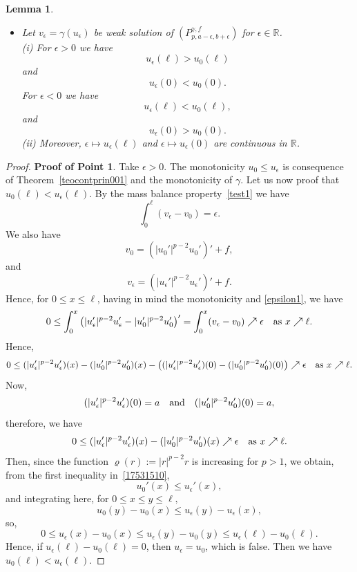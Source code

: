 \documentclass[10pt,a4paper]{amsart}
\newtheorem{lemma}{Lemma}
\begin{document}
\begin{lemma}
\begin{itemize}
\item[3.] Let   $v_\epsilon=\gamma(u_\epsilon)$ be weak solution of $(P_{p,a-\epsilon,b+\epsilon}^{\gamma,f})$ for $\epsilon\in \mathbb{R}$.
\\
(i) For $\epsilon>0$ we have
$$u_\epsilon(\ell)> u_0(\ell)$$ and
$$u_\epsilon(0)< u_0(0).$$
 For $\epsilon<0$ we have
$$u_\epsilon(\ell)< u_0(\ell),$$ and
$$u_\epsilon(0)> u_0(0).$$
(ii) Moreover, $\epsilon\mapsto u_\epsilon(\ell)$ and $\epsilon\mapsto u_\epsilon(0)$ are continuous in $\mathbb{R}$. 
 \end{itemize}
 \end{lemma}

 \begin{proof}  {\bf Proof of Point 1}.    Take  $\epsilon>0$.  The monotonicity  $ u_0 \leq u_\epsilon$ is consequence of Theorem~\ref{teocontprin001} and the monotonicity of $\gamma$. 
 Let us now proof that $u_0(\ell) <u_\epsilon(\ell)$. 
By the mass balance property~\eqref{test1} we have
  \begin{equation}\label{epsilon1}
\int_0^{\ell} (v_\epsilon - v_0) = \epsilon.
  \end{equation}
We also have 
$$v_0 = \left(|u_0'|^{p-2}u_0' \right)' + f,$$
and
  $$v_\epsilon = \left(|u_\epsilon'|^{p-2}u_\epsilon' \right)' + f. $$
Hence, for $0 \leq x \leq \ell$, having in mind the monotonicity and \eqref{epsilon1}, we have
$$0\le \int_0^x \left(  |u_\epsilon'|^{p-2}u_\epsilon'  -  |u_0'|^{p-2}u_0'   \right)'
= \int_0^x (v_\epsilon - v_0) \nearrow \epsilon \quad \hbox{as } x\nearrow \ell.$$
Hence,
$$0\le  (|u_\epsilon'|^{p-2}u_\epsilon') (x) -  (|u_0'|^{p-2}u_0') (x) - \left((|u_\epsilon'|^{p-2}u_\epsilon') (0) -  (|u_0'|^{p-2}u_0') (0) \right) \nearrow \epsilon \quad \hbox{as } x\nearrow \ell.$$
Now, 
$$(|u_\epsilon'|^{p-2}u_\epsilon') (0) = a \quad \hbox{and} \quad (|u_0'|^{p-2}u_0') (0) = a,$$
therefore, we have
\begin{equation}\label{17531510}
0 \leq (|u_\epsilon'|^{p-2}u_\epsilon') (x) -  (|u_0'|^{p-2}u_0') (x) \nearrow \epsilon \quad \hbox{as } x\nearrow \ell.
\end{equation}
Then, since the function $\varrho(r):= \vert r \vert^{p-2}r$ is   increasing for $p >1$, we obtain, from the first inequality in~\eqref{17531510},
$$u_0'(x) \leq u_\epsilon'(x),$$
 and integrating here, for $0\le x\le y\le \ell,$ 
$$u_0(y) - u_0(x)\leq u_\epsilon(y) -  u_\epsilon(x),$$
so,    
\begin{equation}\label{cry001}
0 \leq  u_\epsilon(x)  - u_0(x)\leq u_\epsilon(y) - u_0(y)\le u_\epsilon(\ell) - u_0(\ell).
\end{equation}
 Hence, if $u_\epsilon(\ell) - u_0(\ell)=0$, then $u_\epsilon=u_0$, which is false. Then we have $u_0(\ell) <u_\epsilon(\ell)$.


\end{proof}
\end{document}
